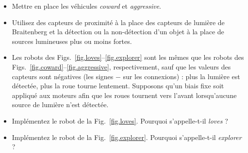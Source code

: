 \begin{framed}
\begin{itemize}
\item Mettre en place les véhicules \emph{coward} et \emph{aggressive}.
\item Utilisez des capteurs de proximité à la place des capteurs de lumière de Braitenberg et la détection ou la non-détection d'un objet à la place de sources lumineuses plus ou moins fortes.
\item Les robots des Figs.~\ref{fig.loves}--\ref{fig.explorer} sont les mêmes que les robots des Figs.~\ref{fig.coward}--\ref{fig.aggressive}, respectivement, sauf que les valeurs des capteurs sont négatives (les signes $-$ sur les connexions) : plus la lumière est détectée, plus la roue tourne lentement. Supposons qu'un biais fixe soit appliqué aux moteurs afin que les roues tournent vers l'avant lorsqu'aucune source de lumière n'est détectée.
\item Implémentez le robot de la Fig.~\ref{fig.loves}. Pourquoi s'appelle-t-il \emph{loves} ?
\item Implémentez le robot de la Fig.~\ref{fig.explorer}. Pourquoi s'appelle-t-il \emph{explorer} ?
\end{itemize}
\end{framed}


